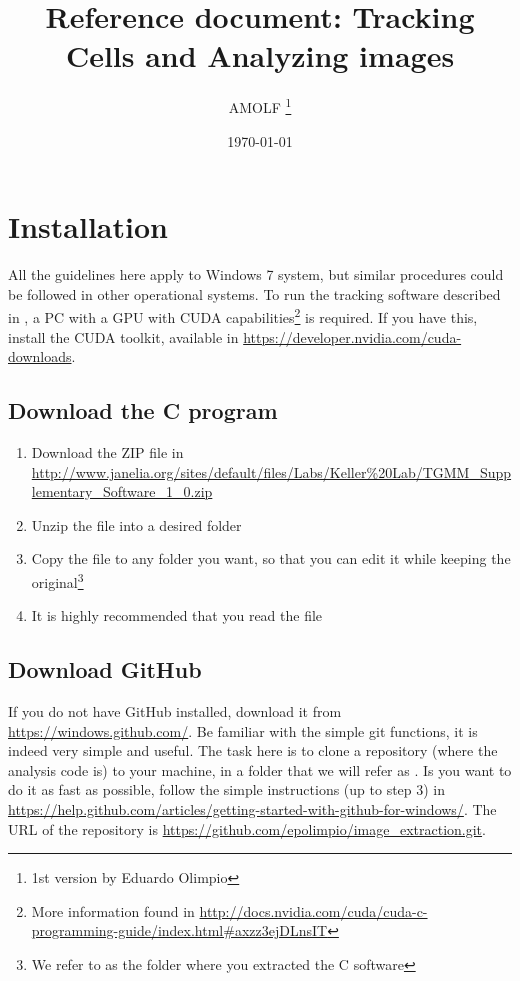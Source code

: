 \documentclass[12pt]{article}
\title{Reference document: Tracking Cells and Analyzing images}
\author{AMOLF \footnote{1st version by Eduardo Olimpio}}
\date{\today}
\begin{document}
\maketitle

\section{Installation}

All the guidelines here apply to Windows 7 system, but similar procedures could be followed in other operational systems. To run the tracking software described in \cite{Amat2014}, a PC with a GPU with CUDA capabilities\footnote{More information found in \url{http://docs.nvidia.com/cuda/cuda-c-programming-guide/index.html#axzz3ejDLnsIT}} is required. If you have this, install the CUDA toolkit, available in \url{https://developer.nvidia.com/cuda-downloads}.

\subsection{Download the C program}

\begin{enumerate}
\item{Download the ZIP file in \url{http://www.janelia.org/sites/default/files/Labs/Keller%20Lab/TGMM_Supplementary_Software_1_0.zip}}
\item{Unzip the file into a desired folder}
\item{Copy the file  to any folder you want, so that you can edit it while keeping the original\footnote{We refer to  as the folder where you extracted the C software}}
\item{It is highly recommended that you read the  file}
\end{enumerate}

\subsection{Download GitHub}

If you do not have GitHub installed, download it from \url{https://windows.github.com/}. Be familiar with the simple git functions, it is indeed very simple and useful. The task here is to clone a repository (where the analysis code is) to your machine, in a folder that we will refer as . Is you want to do it as fast as possible, follow the simple instructions (up to step 3) in \url{https://help.github.com/articles/getting-started-with-github-for-windows/}. The URL of the repository is \url{https://github.com/epolimpio/image_extraction.git}.
\end{document}
